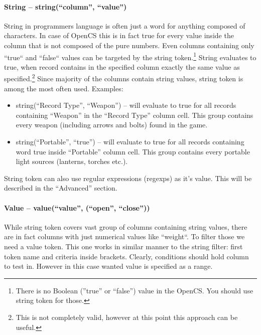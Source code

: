 \paragraph{String -- string(``column'', ``value'')}
String in programmers language is often just a word for anything composed of characters. In case of OpenCS this is in fact true for every value inside the column that is not composed of the pure numbers. Even columns containing only ``true`` and ``false`` values can be targeted by the string token.\footnote{There is no Boolean (''true'' or ``false'') value in the OpenCS. You should use string token for those.} String evaluates to true, when record contains in the specified column exactly the same value as specified.\footnote{This is not completely valid, however at this point this approach can be useful.}
\linebreak
Since majority of the columns contain string values, string token is among the most often used. Examples:
\begin{itemize}
 \item string(``Record Type'', ``Weapon'') -- will evaluate to true for all records containing ``Weapon'' in the ``Record Type'' column cell. This group contains every weapon (including arrows and bolts) found in the game.
 \item string(``Portable'', ``true'') -- will evaluate to true for all records containing word true inside ``Portable'' column cell. This group contains every portable light sources (lanterns, torches etc.).
\end{itemize}
String token can also use regular expressions (regexps) as it's value. This will be described in the ``Advanced'' section.

\paragraph{Value -- value(``value'', (``open'', ``close''))}
While string token covers vast group of columns containing string values, there are in fact columns with just numerical values like ``weight``. To filter those we need a value token. This one works in similar manner to the string filter: first token name and criteria inside brackets. Clearly, conditions should hold column to test in. However in this case wanted value is specified as a range.